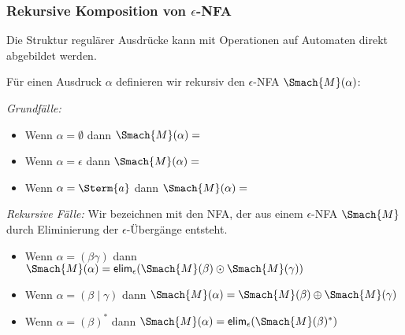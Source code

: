 \documentclass[aspectratio=1610,onlymath]{beamer}
\begin{document}
\begin{frame}\frametitle{Rekursive Komposition von $\epsilon$-NFA}

Die Struktur regulärer Ausdrücke kann mit Operationen auf Automaten direkt abgebildet werden.
\medskip\pause

\alert{Für einen Ausdruck $\alpha$ definieren wir rekursiv den $\epsilon$-NFA $\Smach{M}(\alpha)$:}
\medskip

\emph{Grundfälle:}
\begin{itemize}
\item Wenn $\alpha=\emptyset$ dann $\Smach{M}(\alpha)={}$ 
%
\item Wenn $\alpha=\epsilon$ dann $\Smach{M}(\alpha)={}$ 
\item Wenn $\alpha=\Sterm{a}$ dann $\Smach{M}(\alpha)={}$ 
\end{itemize}\pause

\emph{Rekursive Fälle:}
Wir bezeichnen mit  den NFA, der aus einem $\epsilon$-NFA $\Smach{M}$ durch Eliminierung der $\epsilon$-Übergänge entsteht.
\begin{itemize}
\item Wenn $\alpha=(\beta\gamma)$ dann $\Smach{M}(\alpha)=\textsf{elim}_\epsilon(\Smach{M}(\beta)\odot\Smach{M}(\gamma))$
\item Wenn $\alpha=(\beta\mid\gamma)$ dann $\Smach{M}(\alpha)=\Smach{M}(\beta)\oplus\Smach{M}(\gamma)$
\item Wenn $\alpha=(\beta)^*$ dann $\Smach{M}(\alpha)=\textsf{elim}_\epsilon(\Smach{M}(\beta)^*)$
\end{itemize}

\end{frame}
\end{document}
